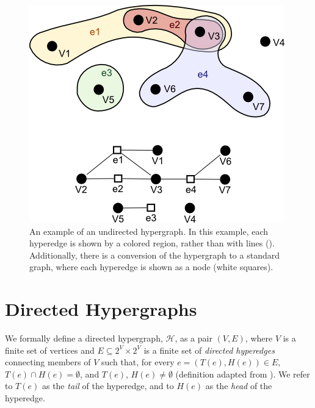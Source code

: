 \documentclass[12pt,twoside]{reedthesis}
\theoremstyle{definition}
\begin{document}
\begin{figure}[h]
  \begin{center}
    \includegraphics[width=\textwidth/2]{undirected_hypergraph}
  \caption[An example undirected hypergraph.]{An example of an undirected hypergraph. In this example, each hyperedge is shown by a colored region, rather than with lines (\cite{sharpen}). Additionally, there is a conversion of the hypergraph to a standard graph, where each hyperedge is shown as a node (white squares).}
  \label{fig:undirected_hypergraph}
  \end{center}
\end{figure}

\section{Directed Hypergraphs}

We formally define a directed hypergraph, $\mathcal{H}$, as a pair $(V,E)$, where $V$ is a finite set of vertices and $E \subseteq 2^V \times 2^V$ is a finite set of \textit{directed hyperedges} connecting members of $V$ such that, for every $e=(T(e),H(e)) \in E$, $T(e) \cap H(e) = \emptyset$, and $T(e)$, $H(e) \neq \emptyset$ (definition adapted from \cite{Gallo1993}).  We refer to $T(e)$ as the \textit{tail} of the hyperedge, and to $H(e)$ as the \textit{head} of the hyperedge.\par
\end{document}
